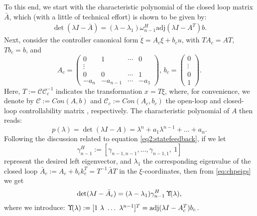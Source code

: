 \documentclass[conference]{IEEEtran}
\newcommand{\hspm}{\hspace{-2pt}}
\newcommand{\acl}{\bar{A}}
\newcommand{\om}{\omega}
\newcommand{\kont}{\mathit{Con}}
\begin{document}
To this end, we start with the characteristic polynomial of the {closed loop} matrix $\acl$, which (with a little of technical effort) is shown to be given by:
\begin{align}
\label{eq:chpeigs}
\det(\lambda I - \acl )  = (\lambda -\lambda_1){\om^H_{n-1}}\textrm{adj}(\lambda I-A^T)b.
\end{align}
Next, consider the controller canonical form $\dot{\xi}= A_c\xi+b_c u$, with $T A_c= A T$,  $T b_c= b$, and \begin{displaymath}
A_{c}=\left(\begin{array}{cccc}
0 & 1 &  \cdots & 0 \\
\vdots &   &      &  \\
0 & 0 &  \cdots & 1 \\
-a_{n} & -a_{n-1} & \cdots  & -a_{1}
\end{array}\right),
\, b_{c}=\left(\begin{array}{l}
0 \\
\vdots \\
0\\
1
\end{array}\right).
\end{displaymath}
Here, $T:=\mathcal{C}\mathcal{C}_{c}^{-1}$ \cite{Kailat80} indicates the transformation $x= T\xi$, where, for convenience, we denote by
$\mathcal{C}:=\kont(A,b)$ and $\mathcal{C}_{c}:=\kont(A_c,b_c)$ the
open-loop and closed-loop controllability matrix \cite{Kailat80}, respectively.
The characteristic polynomial of $A$ then reads:
\begin{equation}
p(\lambda) = \det(\lambda I - A) = \lambda^n+a_{1}\lambda^{n-1}+\ldots+ a_n.
\label{eq:plambda}
\end{equation}
Following the discussion related to equation \eqref{eq2:statefeedback}, if we let
\begin{equation} 	
\label{eqgama10}
\gamma^H_{n-1}:=[\gamma_{n-1,n-1},\ldots, \gamma_{n-1,1},~1]
\end{equation}
represent the desired left eigenvector, and $\lambda_1$ the corresponding eigenvalue of the closed loop
$\acl_{c}:=A_c+b_c k_c^T = T^{-1}\acl T$ in the $\xi$-coordinates, then from \eqref{eq:chpeigs} we get
\begin{equation}
\det(\lambda I -  \acl_{c}) = (\lambda-\lambda_{1}) {\gamma^H_{n-1}} \, \Upsilon\hspm(\lambda),
\label{canocical char pol}
\end{equation}
where we introduce:
$\Upsilon\hspm(\lambda): =[1~\lambda~\ldots~\lambda^{n-1}]^T= \textrm{adj} (\lambda I-A_c^T)b_c$.
\end{document}
